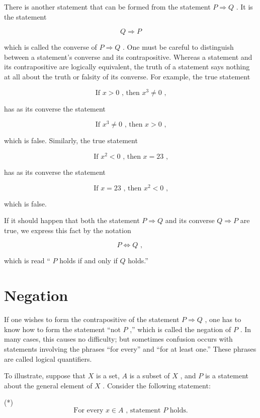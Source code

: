 There is another statement that can be formed from the statement \(P \Rightarrow  Q\) . It is the statement

\[
Q \Rightarrow  P
\]

which is called the converse of \(P \Rightarrow  Q\) . One must be careful to distinguish between a statement's converse and its contrapositive. Whereas a statement and its contrapositive are logically equivalent, the truth of a statement says nothing at all about the truth or falsity of its converse. For example, the true statement

\[
\text{ If }x > 0\text{ , then }{x}^{3} \neq  0\text{ , }
\]

has as its converse the statement

\[
\text{ If }{x}^{3} \neq  0\text{ , then }x > 0\text{ , }
\]

which is false. Similarly, the true statement

\[
\text{ If }{x}^{2} < 0\text{ , then }x = {23}\text{ , }
\]

has as its converse the statement

\[
\text{ If }x = {23}\text{ , then }{x}^{2} < 0\text{ , }
\]

which is false.

If it should happen that both the statement \(P \Rightarrow  Q\) and its converse \(Q \Rightarrow  P\) are true, we express this fact by the notation

\[
P \Leftrightarrow  Q\text{ , }
\]

which is read `` \(P\) holds if and only if \(Q\) holds.''

\section*{Negation}

If one wishes to form the contrapositive of the statement \(P \Rightarrow  Q\) , one has to know how to form the statement ``not \(P\) ,'' which is called the negation of \(P\) . In many cases, this causes no difficulty; but sometimes confusion occurs with statements involving the phrases ``for every'' and ``for at least one.'' These phrases are called logical quantifiers.

To illustrate, suppose that \(X\) is a set, \(A\) is a subset of \(X\) , and \(P\) is a statement about the general element of \(X\) . Consider the following statement:

(*)
\[
\text{ For every }x \in  A\text{ , statement }P\text{ holds. }
\]

